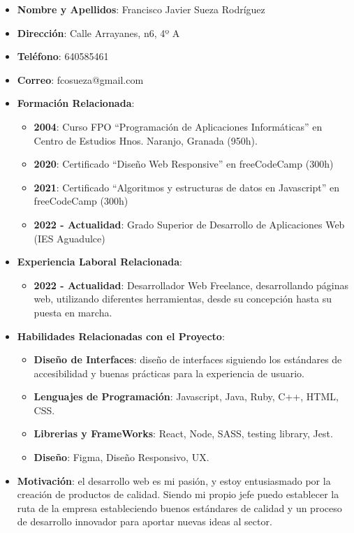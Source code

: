 \begin{itemize}
    \item \textbf{Nombre y Apellidos}: Francisco Javier Sueza Rodríguez
    \item \textbf{Dirección}: Calle Arrayanes, n6, 4º A
    \item \textbf{Teléfono}: 640585461
    \item \textbf{Correo}: fcosueza@gmail.com
    \item \textbf{Formación Relacionada}:
    \begin{itemize}
        \item \textbf{2004}: Curso FPO “Programación de Aplicaciones Informáticas” en Centro de Estudios Hnos.
        Naranjo, Granada (950h).
        \item \textbf{2020}: Certificado “Diseño Web Responsive” en freeCodeCamp (300h)
        \item \textbf{2021}: Certificado “Algoritmos y estructuras de datos en Javascript” en freeCodeCamp (300h)
        \item \textbf{2022 - Actualidad}: Grado Superior de Desarrollo de Aplicaciones Web (IES Aguadulce)
    \end{itemize}
    \item \textbf{Experiencia Laboral Relacionada}:
    \begin{itemize}
        \item \textbf{2022 - Actualidad}: Desarrollador Web Freelance, desarrollando páginas web, utilizando diferentes herramientas, desde su concepción hasta su puesta en marcha.
    \end{itemize}
    \item \textbf{Habilidades Relacionadas con el Proyecto}:
    \begin{itemize}
        \item \textbf{Diseño de Interfaces}: diseño de interfaces siguiendo los estándares de accesibilidad y buenas prácticas para la experiencia de usuario.
        \item \textbf{Lenguajes de Programación}: Javascript, Java, Ruby, C++, HTML, CSS.
        \item \textbf{Librerias y FrameWorks}: React, Node, SASS, testing library, Jest.
        \item \textbf{Diseño}: Figma, Diseño Responsivo, UX.
    \end{itemize}
    \item \textbf{Motivación}: el desarrollo web es mi pasión, y estoy entusiasmado por la creación de productos de calidad. Siendo mi propio jefe puedo establecer la ruta de la empresa estableciendo buenos estándares de calidad y un proceso de desarrollo innovador para aportar nuevas ideas al sector.
\end{itemize}

